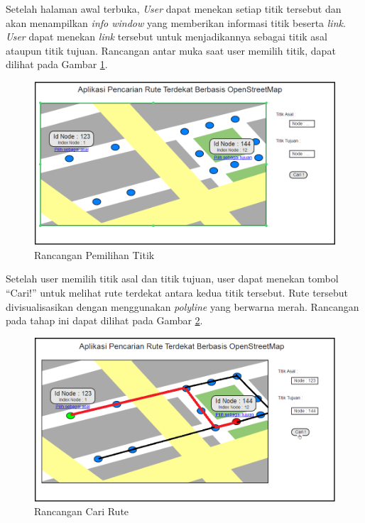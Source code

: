 Setelah halaman awal terbuka, \textit{User} dapat menekan setiap titik tersebut
dan akan menampilkan \textit{info window} yang memberikan informasi titik
beserta \textit{link}. \textit{User} dapat menekan \textit{link} tersebut untuk
menjadikannya sebagai titik asal ataupun titik tujuan. Rancangan antar muka saat
user memilih titik, dapat dilihat pada Gambar \ref{fig:mockup_2}.
\begin{figure}[h]
\centering
\includegraphics[scale=0.6]{Gambar/mockup_2}
\caption[Rancangan Pemilihan Titik]{Rancangan Pemilihan Titik}
\label{fig:mockup_2}
\end{figure}

Setelah user memilih titik asal dan titik tujuan, user dapat menekan tombol
``Cari!'' untuk melihat rute terdekat antara kedua titik tersebut. Rute tersebut
divisualisasikan dengan menggunakan \textit{polyline} yang berwarna merah.
Rancangan pada tahap ini dapat dilihat pada Gambar \ref{fig:mockup_3}.
\begin{figure}[h]
\centering
\includegraphics[scale=0.6]{Gambar/mockup_3}
\caption[Rancangan Cari Rute]{Rancangan Cari Rute}
\label{fig:mockup_3}
\end{figure}

